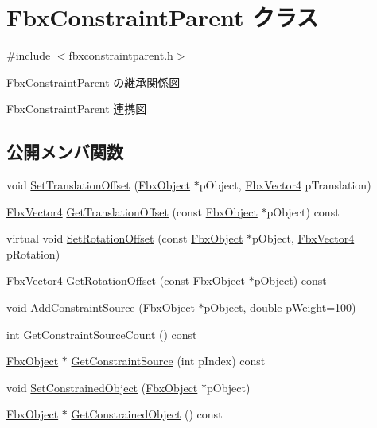 \hypertarget{class_fbx_constraint_parent}{}\section{Fbx\+Constraint\+Parent クラス}
\label{class_fbx_constraint_parent}


{\ttfamily \#include $<$fbxconstraintparent.\+h$>$}



Fbx\+Constraint\+Parent の継承関係図


Fbx\+Constraint\+Parent 連携図
\subsection*{公開メンバ関数}
\begin{DoxyCompactItemize}
\item 
void \hyperlink{class_fbx_constraint_parent_ae821dbbc810b2ee3f27c46d0a66ec55f}{Set\+Translation\+Offset} (\hyperlink{class_fbx_object}{Fbx\+Object} $\ast$p\+Object, \hyperlink{class_fbx_vector4}{Fbx\+Vector4} p\+Translation)
\item 
\hyperlink{class_fbx_vector4}{Fbx\+Vector4} \hyperlink{class_fbx_constraint_parent_a8ba24a43fc99dbef7819ccb921b1ba19}{Get\+Translation\+Offset} (const \hyperlink{class_fbx_object}{Fbx\+Object} $\ast$p\+Object) const
\item 
virtual void \hyperlink{class_fbx_constraint_parent_a22d24573f7d06251dcf94bb488a32386}{Set\+Rotation\+Offset} (const \hyperlink{class_fbx_object}{Fbx\+Object} $\ast$p\+Object, \hyperlink{class_fbx_vector4}{Fbx\+Vector4} p\+Rotation)
\item 
\hyperlink{class_fbx_vector4}{Fbx\+Vector4} \hyperlink{class_fbx_constraint_parent_a35f64fd4fccedbd4070d5e2bdb9ce06b}{Get\+Rotation\+Offset} (const \hyperlink{class_fbx_object}{Fbx\+Object} $\ast$p\+Object) const
\item 
void \hyperlink{class_fbx_constraint_parent_af1cb13c89d62f1de2478a5a102fd5788}{Add\+Constraint\+Source} (\hyperlink{class_fbx_object}{Fbx\+Object} $\ast$p\+Object, double p\+Weight=100)
\item 
int \hyperlink{class_fbx_constraint_parent_aa7747054ebeee0f94ce907451f648497}{Get\+Constraint\+Source\+Count} () const
\item 
\hyperlink{class_fbx_object}{Fbx\+Object} $\ast$ \hyperlink{class_fbx_constraint_parent_a687e5a56dfd3882d4ff0c3454a976051}{Get\+Constraint\+Source} (int p\+Index) const
\item 
void \hyperlink{class_fbx_constraint_parent_a49473a23e0aae69dd06ee4bd19b6fee3}{Set\+Constrained\+Object} (\hyperlink{class_fbx_object}{Fbx\+Object} $\ast$p\+Object)
\item 
\hyperlink{class_fbx_object}{Fbx\+Object} $\ast$ \hyperlink{class_fbx_constraint_parent_a8c878a029a5628f328244f824d3f8847}{Get\+Constrained\+Object} () const
\end{DoxyCompactItemize}

